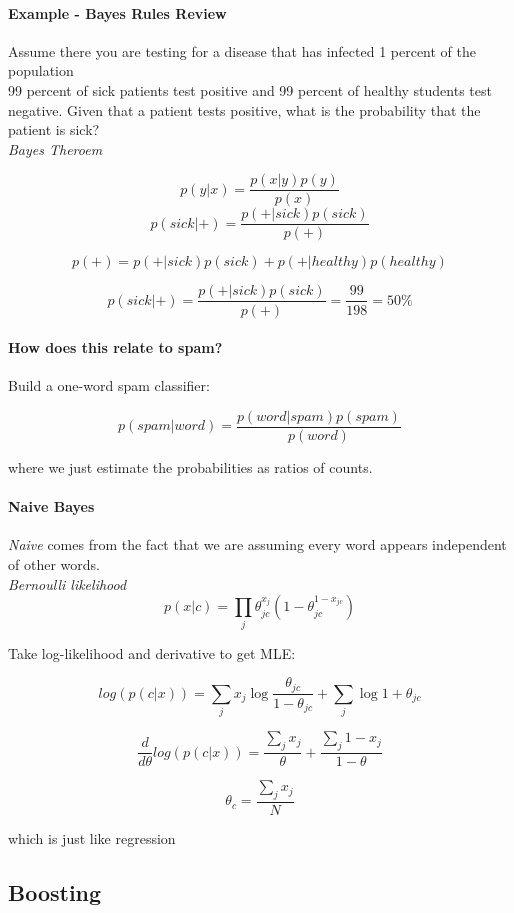 \paragraph{Example - Bayes Rules Review}
Assume there you are testing for a disease that has infected 1 percent of the population\\

99 percent of sick patients test positive and 99 percent of healthy students test negative. Given that a patient tests positive, what is the probability that the patient is sick?\\

\textit{Bayes Theroem}

$$p(y|x) = \frac{p(x|y)p(y)}{p(x)}$$
$$p(sick|+) = \frac{p(+|sick)p(sick)}{p(+)}$$

$$p(+) = p(+|sick)p(sick)+p(+|healthy)p(healthy)$$

$$p(sick|+) = \frac{p(+|sick)p(sick)}{p(+)} = \frac{99}{198} = 50 \%$$

\paragraph{How does this relate to spam?\\}
Build a one-word spam classifier:

$$p(spam|word) = \frac{p(word|spam)p(spam)}{p(word)}$$

where we just estimate the probabilities as ratios of counts. 

\paragraph{Naive Bayes}
\textit{Naive} comes from the fact that we are assuming every word appears independent of other words.\\

\textit{Bernoulli likelihood}
$$p(x|c) = \prod_j{\theta_{jc}^{x_j} (1-\theta_{jc}^{1-x_{jc}})}$$

Take log-likelihood and derivative to get MLE:

$$log(p(c|x)) = \sum_j{x_j\log{\frac{\theta_{jc}}{1-\theta_{jc}}}+\sum_j{\log{1+\theta_{jc}}}}$$

$$\frac{d}{d\theta}log(p(c|x)) = \frac{\sum_j{x_j}}{\theta}+\frac{\sum_j{1-x_j}}{1-\theta}$$

$$\theta_c = \frac{\sum_j{x_j}}{N}$$

which is just like regression

\subsection{Boosting}

